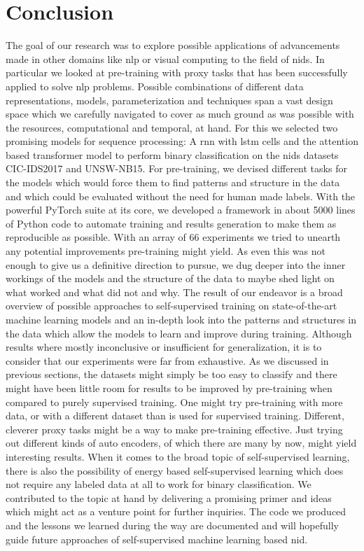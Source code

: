 \chapter{Conclusion} \label{sec:conclusion}

The goal of our research was to explore possible applications of advancements made in other domains like \gls{nlp} or visual computing to the field of \gls{nids}. In particular we looked at pre-training with proxy tasks that has been successfully applied to solve \gls{nlp} problems. Possible combinations of different data representations, models, parameterization and techniques span a vast design space which we carefully navigated to cover as much ground as was possible with the resources, computational and temporal, at hand. For this we selected two promising models for sequence processing: A \gls{rnn} with \gls{lstm} cells and the attention based transformer model to perform binary classification on the \gls{nids} datasets CIC-IDS2017 and UNSW-NB15. For pre-training, we devised different tasks for the models which would force them to find patterns and structure in the data and which could be evaluated without the need for human made labels. With the powerful PyTorch suite at its core, we developed a framework in about 5000 lines of Python code to automate training and results generation to make them as reproducible as possible. With an array of 66 experiments we tried to unearth any potential improvements pre-training might yield. As even this was not enough to give us a definitive direction to pursue, we dug deeper into the inner workings of the models and the structure of the data to maybe shed light on what worked and what did not and why. The result of our endeavor is a broad overview of possible approaches to self-supervised training on state-of-the-art machine learning models and an in-depth look into the patterns and structures in the data which allow the models to learn and improve during training. Although results where mostly inconclusive or insufficient for generalization, it is to consider that our experiments were far from exhaustive. As we discussed in previous sections, the datasets might simply be too easy to classify and there might have been little room for results to be improved by pre-training when compared to purely supervised training. One might try pre-training with more data, or with a different dataset than is used for supervised training. Different, cleverer proxy tasks might be a way to make pre-training effective. Just trying out different kinds of auto encoders, of which there are many by now, might yield interesting results. When it comes to the broad topic of self-supervised learning, there is also the possibility of energy based self-supervised learning which does not require any labeled data at all to work for binary classification. We contributed to the topic at hand by delivering a promising primer and ideas which might act as a venture point for further inquiries. The code we produced and the lessons we learned during the way are documented and will hopefully guide future approaches of self-supervised machine learning based \gls{nid}.

\newpage